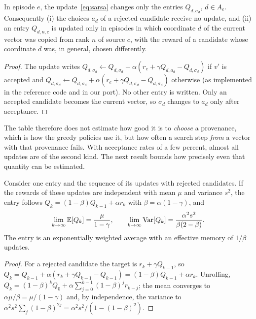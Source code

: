 \begin{proposition}
\label{prop:credit}
In episode $e$, the update~\eqref{eq:sarsa} changes only the entries $Q_{d,\sigma_d}$, $d\in A_e$. Consequently (i) the
choices $a_d$ of a rejected candidate receive no update, and (ii) an entry $Q_{d,n,c}$ is updated only in episodes in which
coordinate $d$ of the current vector was copied from rank $n$ of source $c$, with the reward of a candidate whose coordinate
$d$ was, in general, chosen differently.
\end{proposition}
\begin{proof}
The update writes $Q_{d,\sigma_d}\gets Q_{d,\sigma_d}+\alpha(r_e+\gamma Q_{d,a_d}-Q_{d,\sigma_d})$ if $v'$ is accepted and
$Q_{d,\sigma_d}\gets Q_{d,\sigma_d}+\alpha(r_e+\gamma Q_{d,\sigma_d}-Q_{d,\sigma_d})$ otherwise (as implemented in the
reference code and in our port). No other entry is written. Only an accepted candidate becomes the
current vector, so $\sigma_d$ changes to $a_d$ only after acceptance.
\end{proof}

The table therefore does not estimate how good it is to \emph{choose} a provenance, which is how the greedy policies use
it, but how often a search step \emph{from} a vector with that provenance fails. With acceptance rates of a few percent,
almost all updates are of the second kind. The next result bounds how precisely even that quantity can be estimated.

\begin{proposition}
\label{prop:noise}
Consider one entry and the sequence of its updates with rejected candidates. If the rewards of these updates are independent
with mean $\mu$ and variance $s^2$, the entry follows $Q_k=(1-\beta)Q_{k-1}+\alpha r_k$ with $\beta=\alpha(1-\gamma)$, and
\begin{equation}
\lim_{k\to\infty}\mathbb{E}[Q_k]=\frac{\mu}{1-\gamma},\qquad
\lim_{k\to\infty}\mathrm{Var}[Q_k]=\frac{\alpha^2 s^2}{\beta(2-\beta)}.
\label{eq:noise}
\end{equation}
The entry is an exponentially weighted average with an effective memory of $1/\beta$ updates.
\end{proposition}
\begin{proof}
For a rejected candidate the target is $r_k+\gamma Q_{k-1}$, so $Q_k=Q_{k-1}+\alpha(r_k+\gamma Q_{k-1}-Q_{k-1})
=(1-\beta)Q_{k-1}+\alpha r_k$. Unrolling, $Q_k=(1-\beta)^kQ_0+\alpha\sum_{j=0}^{k-1}(1-\beta)^j r_{k-j}$; the mean converges to
$\alpha\mu/\beta=\mu/(1-\gamma)$ and, by independence, the variance to
$\alpha^2 s^2\sum_j(1-\beta)^{2j}=\alpha^2s^2/(1-(1-\beta)^2)$.
\end{proof}

